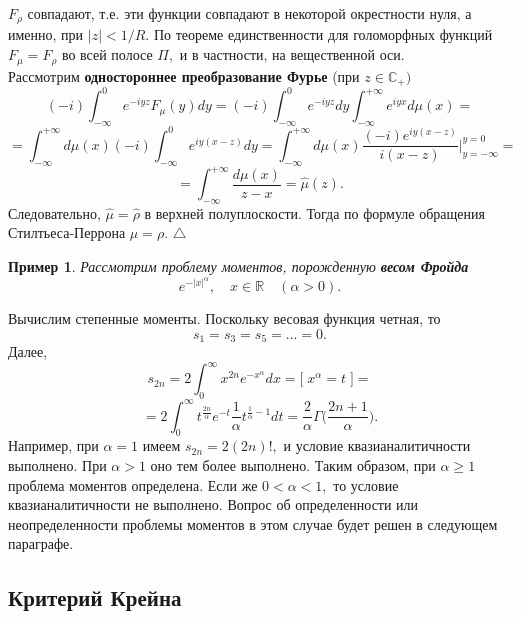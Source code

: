 \documentclass[12 pt, a4 paper]{article}
\theoremstyle{plain}   \newtheorem{Pro}{Задача}
\newtheorem{Exa}{Пример}
\begin{document}
$ F_{\rho} $
совпадают, т.е. эти функции совпадают в некоторой окрестности нуля,
а именно, при
$ |z|<1/R . $
По теореме единственности для голоморфных функций
$ F_{\mu}=F_{\rho} $
во всей полосе
$ \Pi , $
и в частности, на вещественной оси.
\\
Рассмотрим
{\bfseries одностороннее преобразование Фурье}
(при
$ z \in \mathbb{C}_+ ) $
$$
  (-i)\int _{-\infty}^0 e^{-iyz}F_{\mu}(y)dy=
  (-i)\int _{-\infty}^0 e^{-iyz}dy
  \int _{-\infty}^{+\infty} e^{iyx}d\mu (x)=
$$
$$
  =\int _{-\infty}^{+\infty} d\mu (x)
  (-i)\int _{-\infty}^0 e^{iy(x-z)}dy=
  \int _{-\infty}^{+\infty} d\mu (x)
  \frac{(-i)e^{iy(x-z)}}{i(x-z)} \Bigg | _{y=-\infty}^{y=0}=
$$
$$
  =\int _{-\infty}^{+\infty} \frac{d\mu (x)}{z-x}=
  \hat \mu (z).
$$
Следовательно,
$ \hat \mu = \hat \rho $
в верхней полуплоскости. Тогда по формуле обращения
Стилтьеса-Перрона
$ \mu = \rho . $
$ \triangle $
\begin{Exa}
Рассмотрим проблему моментов, порожденную
{\bfseries весом Фройда}
$$
  e^{-|x|^{\alpha}}, \quad x \in \mathbb{R} \quad (\alpha >0).
$$
\end{Exa}
Вычислим степенные моменты. Поскольку весовая функция четная, то
$$
  s_1 =s_3 =s_5 =...=0.
$$
Далее,
$$
  s_{2n}=2 \int _0 ^{\infty} x^{2n} e^{-x^{\alpha}}dx=
  \bigl [ \; x^{\alpha}=t \; \bigr ] =
$$
$$
  =2 \int _0 ^{\infty} t^{\frac{2n}{\alpha}}e^{-t}
  \frac{1}{\alpha} t^{\frac{1}{\alpha}-1}dt=
  \frac{2}{\alpha} \Gamma \biggl (
  \frac{2n+1}{\alpha} \biggr ) .
$$
Например, при
$ \alpha =1 $
имеем
$ s_{2n}=2(2n)! , $
и условие квазианалитичности выполнено. При
$ \alpha >1 $
оно тем более выполнено. Таким образом, при
$ \alpha \geq 1 $
проблема моментов определена. Если же
$ 0<\alpha <1 , $
то условие квазианалитичности не выполнено. Вопрос об
определенности или неопределенности проблемы моментов
в этом случае будет решен в следующем параграфе.
\newpage
\subsection{Критерий Крейна}
$ \; $
\\
\end{document}
